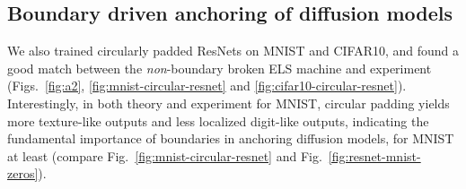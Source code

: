 \documentclass{article}
\theoremstyle{plain}
\theoremstyle{definition}
\theoremstyle{remark}
\begin{document}
\subsection{Boundary driven anchoring of diffusion models}

We also trained circularly padded ResNets on MNIST and CIFAR10, and found a good match between the {\it non}-boundary broken ELS machine and experiment (Figs.~\ref{fig:a2}, \ref{fig:mnist-circular-resnet} and \ref{fig:cifar10-circular-resnet}). Interestingly, in both theory and experiment for MNIST, circular padding yields more texture-like outputs and less localized digit-like outputs, indicating the fundamental importance of boundaries in anchoring diffusion models, for MNIST at least (compare Fig.~\ref{fig:mnist-circular-resnet} and Fig.~\ref{fig:resnet-mnist-zeros}). 
\end{document}
